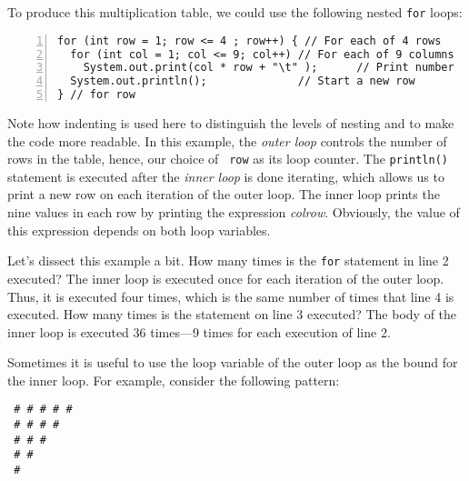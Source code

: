 \noindent To produce this multiplication table, we could use the following
nested {\tt for} loops:

\begin{jjjlisting}[28pc]
\begin{lstlisting}[numberstyle=\small, numbers=left]
for (int row = 1; row <= 4 ; row++) { // For each of 4 rows      
  for (int col = 1; col <= 9; col++) // For each of 9 columns   
    System.out.print(col * row + "\t" );      // Print number
  System.out.println();              // Start a new row         
} // for row
\end{lstlisting}
\end{jjjlisting}

\noindent Note how indenting is used here to distinguish the
levels of nesting and to make the code more readable. In this example,
the {\it outer loop}
controls the number of rows in the table, hence, our choice of {\tt
row} as its loop counter.  The {\tt println()} statement is executed
after the {\it inner loop} is done iterating, which allows us to print
a new row on each iteration of the outer loop.  The inner loop prints
the nine values in each row by printing the expression {\it
col\hbox{\tt *}row}. Obviously, the value of this expression depends
on both loop variables.

Let's dissect this example a bit.  How many times is the {\tt for}
statement in line 2 executed? The inner loop is executed once for each
iteration of the outer loop.  Thus, it is executed four times, which
is the same number of times that line 4 is executed.  How many times
is the statement on line 3 executed? The body of the inner loop is
executed 36 times---9 times for each execution of line 2.

Sometimes it is useful to use the loop variable of the outer loop as
the bound for the inner loop.  For example, consider the following
pattern:

\begin{jjjlisting}
\begin{lstlisting}
 # # # # #
 # # # #
 # # #
 # #
 #
\end{lstlisting}
\end{jjjlisting}

